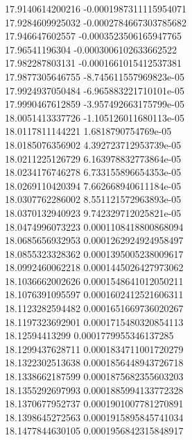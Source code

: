 {17.9140614200216 -0.0001987311115954071 \\
17.9284609925032 -0.0002784667303785682 \\
17.946647602557 -0.0003523506165947765 \\
17.96541196304 -0.0003006102633662522 \\
17.982287803131 -0.0001661015412537381 \\
17.9877305646755 -8.745611557969823e-05 \\
17.9924937050484 -6.965883221710101e-05 \\
17.9990467612859 -3.957492663175799e-05 \\
18.0051413337726 -1.105126011680113e-05 \\
18.0117811144221 1.6818790754769e-05 \\
18.0185076356902 4.392723712953739e-05 \\
18.0211225126729 6.163978832773864e-05 \\
18.0234176746278 6.733155896654353e-05 \\
18.0269110420394 7.662668940611184e-05 \\
18.0307762286002 8.551121572963893e-05 \\
18.0370132940923 9.742329712025821e-05 \\
18.0474996073223 0.0001108418800868094 \\
18.0685656932953 0.0001262924924958497 \\
18.0855323328362 0.0001395005238009617 \\
18.0992460062218 0.0001445026427973062 \\
18.1036662002626 0.0001548641012050211 \\
18.1076391095597 0.0001602412521606311 \\
18.1123282594482 0.0001651669736020267 \\
18.1197323692901 0.0001715480320854113 \\
18.12594413299 0.0001779955346137285 \\
18.1299437628711 0.0001834711001720279 \\
18.1322302513638 0.0001856448943726718 \\
18.1338662187599 0.0001875682355603203 \\
18.1355292697993 0.0001885994133772328 \\
18.1370677952737 0.0001901007781270891 \\
18.1398645272563 0.0001915895845741034 \\
18.1477844630105 0.0001956842315848917 \\
}
